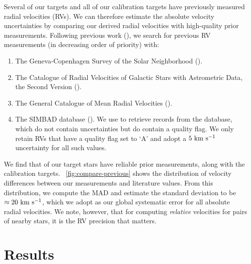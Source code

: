 \documentclass[modern, letterpaper]{aastex61}
\begin{document}
Several of our targets and all of our calibration targets have previously
measured radial velocities (RVs).
We can therefore estimate the absolute velocity uncertainties by comparing our
derived radial velocities with high-quality prior measurements.
Following previous work (\citealt{Shaya:2011}), we search for previous RV
measurements (in decreasing order of priority) with:
\begin{enumerate}
  \item The Geneva-Copenhagen Survey of the Solar Neighborhood
  (\citealt{Nordstrom:2004}).
  \item The Catalogue of Radial Velocities of Galactic Stars with Astrometric
  Data, the Second Version (\citealt{Kharchenko:2007}).
  \item The General Catalogue of Mean Radial Velocities
  (\citealt{Barbier-Brossat:2000}).
  \item The SIMBAD database (\citealt{Wenger:2000}). We use 
  to retrieve records from the database, which do not contain uncertainties but
  do contain a quality flag. We only retain RVs that have a quality flag set to
  `A' and adopt a $5~\mathrm{km}~\mathrm{s}^{-1}$ uncertainty for all such values.
\end{enumerate}
We find that  of our target stars have reliable prior measurements,
along with the  calibration targets.
\figurename~\ref{fig:compare-previous} shows the distribution of velocity
differences between our measurements and literature values.
From this distribution, we compute the MAD and estimate the standard deviation
to be $\approx 20~\mathrm{km}~\mathrm{s}^{-1}$, which we adopt as our global systematic error for all
absolute radial velocities.
We note, however, that for computing \emph{relative} velocities for pairs of
nearby stars, it is the RV precision that matters.


\section{Results}

\end{document}
